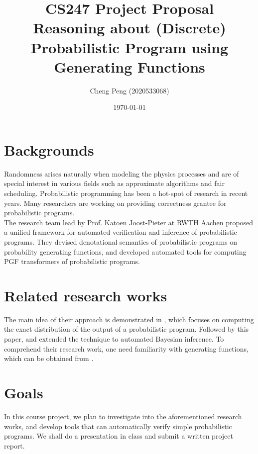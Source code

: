 \documentclass[a4paper, 8pt]{article}
\title{CS247 Project Proposal\\
Reasoning about (Discrete) Probabilistic Program using Generating Functions}
\date{\today}
\author{Cheng Peng (2020533068)}
\begin{document}
\maketitle

\section{Backgrounds}

Randomness arises naturally when modeling the physics processes and are of special interest in various fields such as approximate algorithms and fair scheduling. Probabilistic programming has been a hot-spot of research in recent years. Many researchers are working on providing correctness grantee for probabilistic programs.\\
The research team lead by Prof. Katoen Joost-Pieter at RWTH Aachen proposed a unified framework for automated verification and inference of probabilistic programs. They devised denotational semantics of probabilistic programs on probability generating functions, and developed automated tools for computing PGF transformers of probabilistic programs.

\section{Related research works}

The main idea of their approach is demonstrated in \cite{cav-pgf}, which focuses on computing the exact distribution of the output of a probabilistic program. Followed by this paper, \cite{OOPSLA2024-inf-loop} and \cite{lafi-inf} extended the technique to automated Bayesian inference.
To comprehend their research work, one need familiarity with generating functions, which can be obtained from \cite{gfbook}.

\section{Goals}

In this course project, we plan to investigate into the aforementioned research works, and develop tools that can automatically verify simple probabilistic programs. We shall do a presentation in class and submit a written project report.

\appendix
\end{document}
